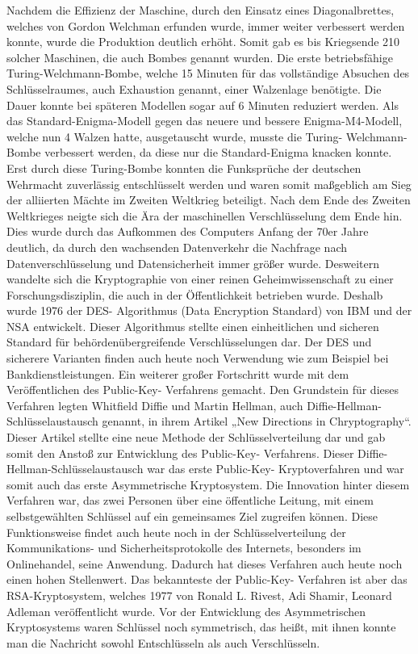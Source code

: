 Nachdem die Effizienz der Maschine, durch den Einsatz eines Diagonalbrettes, welches von Gordon Welchman erfunden wurde, immer weiter verbessert werden konnte, wurde die Produktion deutlich erhöht. Somit gab es bis Kriegsende 210 solcher Maschinen, die auch Bombes genannt wurden. Die erste betriebsfähige Turing-Welchmann-Bombe, welche 15 Minuten für das vollständige Absuchen des Schlüsselraumes, auch Exhaustion genannt, einer Walzenlage benötigte. Die Dauer konnte bei späteren Modellen sogar auf 6 Minuten reduziert werden. Als das Standard-Enigma-Modell gegen das neuere und bessere Enigma-M4-Modell, welche nun 4 Walzen hatte, ausgetauscht wurde, musste die Turing- Welchmann- Bombe verbessert werden, da diese nur die Standard-Enigma knacken konnte. Erst durch diese Turing-Bombe konnten die Funksprüche der deutschen Wehrmacht zuverlässig entschlüsselt werden und waren somit maßgeblich am Sieg der alliierten Mächte im Zweiten Weltkrieg beteiligt. Nach dem Ende des Zweiten Weltkrieges neigte sich die Ära der maschinellen Verschlüsselung dem Ende hin. Dies wurde durch das Aufkommen des Computers Anfang der 70er Jahre deutlich, da durch den wachsenden Datenverkehr die Nachfrage nach Datenverschlüsselung und Datensicherheit immer größer wurde. Desweitern wandelte sich die Kryptographie von einer reinen Geheimwissenschaft zu einer Forschungsdisziplin, die auch in der Öffentlichkeit betrieben wurde. Deshalb wurde 1976 der DES- Algorithmus (Data Encryption Standard) von IBM und der NSA entwickelt. Dieser Algorithmus stellte einen einheitlichen und sicheren Standard für behördenübergreifende Verschlüsselungen dar. Der DES und sicherere Varianten finden auch heute noch Verwendung wie zum Beispiel bei Bankdienstleistungen. Ein weiterer großer Fortschritt wurde mit dem Veröffentlichen des Public-Key- Verfahrens gemacht. Den Grundstein für dieses Verfahren legten Whitfield Diffie und Martin Hellman, auch Diffie-Hellman-Schlüsselaustausch genannt, in ihrem Artikel „New Directions in Chryptography“. Dieser Artikel stellte eine neue Methode der Schlüsselverteilung dar und gab somit den Anstoß zur Entwicklung des Public-Key- Verfahrens. Dieser Diffie-Hellman-Schlüsselaustausch war das erste Public-Key- Kryptoverfahren und war somit auch das erste Asymmetrische Kryptosystem. Die Innovation hinter diesem Verfahren war, das zwei Personen über eine öffentliche Leitung, mit einem selbstgewählten Schlüssel auf ein gemeinsames Ziel zugreifen können. Diese Funktionsweise findet auch heute noch in der Schlüsselverteilung der Kommunikations- und Sicherheitsprotokolle des Internets, besonders im Onlinehandel, seine Anwendung. Dadurch hat dieses Verfahren auch heute noch einen hohen Stellenwert. Das bekannteste der Public-Key- Verfahren ist aber das RSA-Kryptosystem, welches 1977 von Ronald L. Rivest, Adi Shamir, Leonard Adleman veröffentlicht wurde. Vor der Entwicklung des Asymmetrischen Kryptosystems waren Schlüssel noch symmetrisch, das heißt, mit ihnen konnte man die Nachricht sowohl Entschlüsseln als auch Verschlüsseln. 



